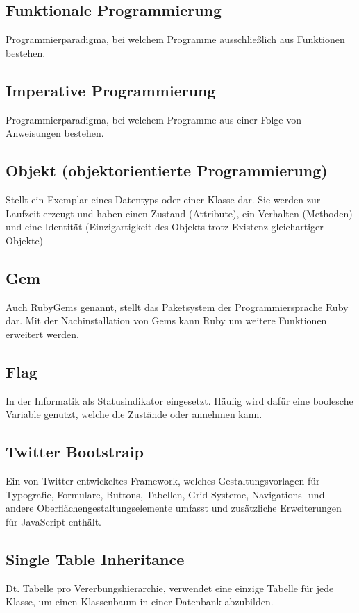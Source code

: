 \subsection*{Funktionale Programmierung}
Programmierparadigma, bei welchem Programme ausschließlich aus Funktionen bestehen.
\subsection*{Imperative Programmierung}
Programmierparadigma, bei welchem Programme aus einer Folge von Anweisungen bestehen.
\subsection*{Objekt (objektorientierte Programmierung)}
Stellt ein Exemplar eines Datentyps oder einer Klasse dar. Sie werden zur Laufzeit erzeugt und haben
einen Zustand (Attribute), ein Verhalten (Methoden) und eine Identität (Einzigartigkeit des Objekts trotz
Existenz gleichartiger Objekte)
\subsection*{Gem}
Auch RubyGems genannt, stellt das Paketsystem der Programmiersprache Ruby dar. Mit der Nachinstallation
von Gems kann Ruby um weitere Funktionen erweitert werden.
\subsection*{Flag}
In der Informatik als Statusindikator eingesetzt. Häufig wird dafür eine boolesche Variable genutzt,
welche die Zustände  oder  annehmen kann.
\subsection*{Twitter Bootstraip}
Ein von Twitter entwickeltes Framework, welches Gestaltungsvorlagen für
Typografie, Formulare, Buttons, Tabellen, Grid-Systeme, Navigations- und andere
Oberflächengestaltungselemente umfasst und zusätzliche Erweiterungen für JavaScript enthält.
\subsection*{Single Table Inheritance}
Dt. Tabelle pro Vererbungshierarchie, verwendet eine einzige Tabelle für jede Klasse, um einen
Klassenbaum in einer Datenbank abzubilden.
